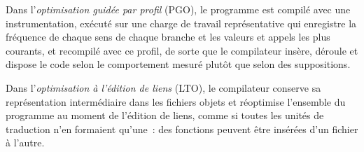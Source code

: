 \begin{definition}\label{def:ll:cpp-for-latency-iii-the-compiler:pgo}
Dans l'\emph{optimisation guidée par profil} (PGO), le programme est compilé avec une instrumentation,
exécuté sur une charge de travail représentative qui enregistre la fréquence de chaque sens de chaque branche et les valeurs et appels les plus courants,
et recompilé avec ce profil, de sorte que le compilateur insère, déroule et dispose le code selon le comportement mesuré
plutôt que selon des suppositions.
\end{definition}

\begin{definition}\label{def:ll:cpp-for-latency-iii-the-compiler:lto}
Dans l'\emph{optimisation à l'édition de liens} (LTO), le compilateur conserve sa représentation intermédiaire
dans les fichiers objets et réoptimise l'ensemble du programme au moment de l'édition de liens, comme si toutes les unités de traduction n'en formaient qu'une~: des fonctions
peuvent être insérées d'un fichier à l'autre.
\end{definition}

